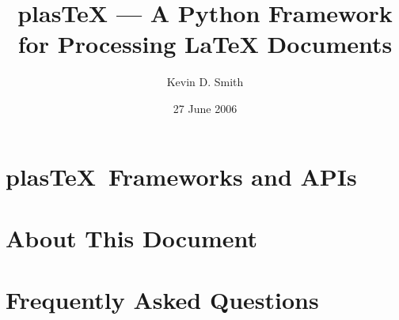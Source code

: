 \documentclass{manual}
\title{plasTeX --- A Python Framework for Processing LaTeX Documents}
\author{Kevin D. Smith}
\date{27 June 2006}
\newcommand{\plasTeX}{plas\TeX}
\begin{document}
\maketitle
\cleardoublepage
\tableofcontents












\chapter{\plasTeX\ Frameworks and APIs}









\appendix

\chapter{About This Document}



\chapter{Frequently Asked Questions}




\end{document}
